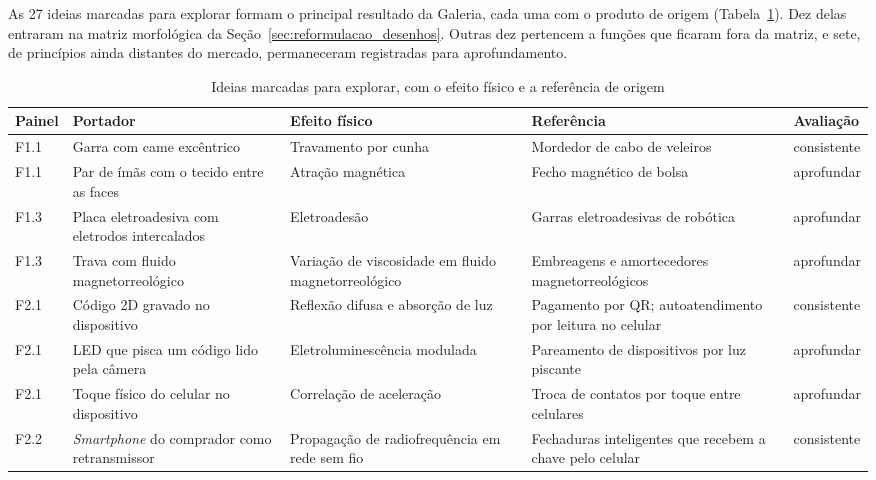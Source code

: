 As 27 ideias marcadas para explorar formam o principal resultado da Galeria, cada uma com o produto de origem (Tabela~\ref{tab:aprov_explorar}). Dez delas entraram na matriz morfológica da Seção~\ref{sec:reformulacao_desenhos}. Outras dez pertencem a funções que ficaram fora da matriz, e sete, de princípios ainda distantes do mercado, permaneceram registradas para aprofundamento.

\begin{table}[p]
    \centering
    \caption{Ideias marcadas para explorar, com o efeito físico e a referência de origem}
    \label{tab:aprov_explorar}
    \scriptsize
    \setlength{\tabcolsep}{4pt}
    \renewcommand{\arraystretch}{1.2}
    \begin{tabularx}{\textwidth}{@{}
        >{\RaggedRight\arraybackslash}p{0.9cm}
        >{\RaggedRight\arraybackslash}X
        >{\RaggedRight\arraybackslash}p{3.5cm}
        >{\RaggedRight\arraybackslash}p{4.0cm}
        >{\RaggedRight\arraybackslash}p{1.5cm}@{}}
        \toprule
        \textbf{Painel} & \textbf{Portador} & \textbf{Efeito físico} & \textbf{Referência} & \textbf{Avaliação} \\
        \midrule
        F1.1 & Garra com came excêntrico & Travamento por cunha & Mordedor de cabo de veleiros & consistente \\
        F1.1 & Par de ímãs com o tecido entre as faces & Atração magnética & Fecho magnético de bolsa & aprofundar \\
        F1.3 & Placa eletroadesiva com eletrodos intercalados & Eletroadesão & Garras eletroadesivas de robótica & aprofundar \\
        F1.3 & Trava com fluido magnetorreológico & Variação de viscosidade em fluido magnetorreológico & Embreagens e amortecedores magnetorreológicos & aprofundar \\
        F2.1 & Código 2D gravado no dispositivo & Reflexão difusa e absorção de luz & Pagamento por QR; autoatendimento por leitura no celular & consistente \\
        F2.1 & LED que pisca um código lido pela câmera & Eletroluminescência modulada & Pareamento de dispositivos por luz piscante & aprofundar \\
        F2.1 & Toque físico do celular no dispositivo & Correlação de aceleração & Troca de contatos por toque entre celulares & aprofundar \\
        F2.2 & \textit{Smartphone} do comprador como retransmissor & Propagação de radiofrequência em rede sem fio & Fechaduras inteligentes que recebem a chave pelo celular & consistente \\

\end{tabularx}
\end{table}
